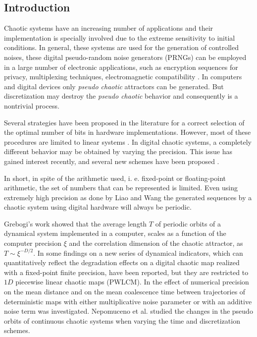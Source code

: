 \subsection{Introduction} \label{sec:intro}

Chaotic systems have an increasing number of applications and their implementation is specially involved due to the extreme sensitivity to initial conditions.
In general, these systems are used for the generation of controlled noises, these digital pseudo-random noise generators (PRNGs) can be employed in a large number of electronic applications, such as encryption sequences for privacy, multiplexing techniques, electromagnetic compatibility \cite{Machado2004,Smaoui2009,DeMicco2007A,DeMicco2007C,DeMicco2007B}.
In computers and digital devices only \textsl{pseudo chaotic} attractors can be generated.
But discretization may destroy the \textsl{pseudo chaotic} behavior and consequently is a nontrivial process.

Several strategies have been proposed in the literature for a correct selection of the optimal number of bits in hardware implementations.
However, most of these procedures are limited to linear systems \cite{Constantinides2002,Constantinides2003}.
In digital chaotic systems, a completely different behavior may be obtained by varying the precision.
This issue has gained interest recently, and several new schemes have been proposed \cite{Ding2007,Asseri2002,Azzaz2009}.

In short, in spite of the arithmetic used, i. e. fixed-point or floating-point arithmetic, the set of numbers that can be represented is limited. 
Even using extremely high precision as done by Liao and Wang \cite{Liao2013a} the generated sequences by a chaotic system using digital hardware will always be periodic.

Grebogi's work \cite{Grebogi1988} showed that the average length $T$  of periodic orbits of a dynamical system implemented in a computer, scales as a function of the computer precision $\xi$ and the correlation dimension of the chaotic attractor, as $T \sim  \xi^{-D/2}$.
In \cite{SHUJUN2005} some findings on a new series of dynamical indicators, which can quantitatively reflect the degradation effects on a digital chaotic map realized with a fixed-point finite precision, have been reported, but they are restricted to $1D$ piecewise linear chaotic maps (PWLCM).
In \cite{Dias2011} the effect of numerical precision on the mean distance and on the mean coalescence time between trajectories of deterministic maps with either multiplicative noise parameter or with an additive noise term was investigated.
Nepomuceno et al. \cite{Nepomuceno2017} studied the changes in the pseudo orbits of continuous chaotic systems when varying the time and discretization schemes.

